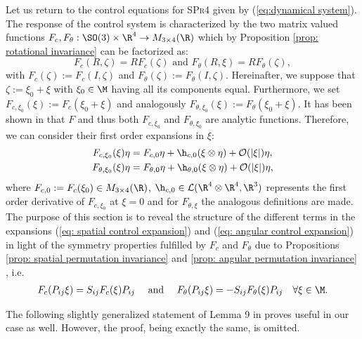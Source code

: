 \label{sec: linearization}
Let us return to the control equations for \textsc{SPr4} given by (\ref{eq:dynamical system}). The response of the control system is characterized by the two matrix valued functions $F_c, F_{\theta}: \SO(3) \times \R^4 \to M_{3 \times 4}(\R)$ which by Proposition \ref{prop: rotational invariance} can be factorized as:
\begin{equation}
\label{eq: reminder control system}
	F_{c}(R, \zeta) = R F_{c}(\zeta) \text{ and } F_{\theta}(R, \xi) = R F_{\theta}(\zeta),
\end{equation}
with $F_{c}(\zeta) := F_c(I, \zeta)$ and $F_{\theta}(\zeta) := F_{\theta}(I, \zeta)$. Hereinafter, we suppose that $\zeta := \xi_0 + \xi$ with $\xi_0 \in \M$ having all its components equal. Furthermore, we set $F_{c, \xi_0}(\xi) := F_{c}(\xi_0 + \xi)$ and analogously $F_{\theta, \xi_0}(\xi) := F_{\theta}(\xi_0 + \xi)$. It has been shown in \cite{Alouges2013} that $F$ and thus both $F_{ c, \xi_0}$ and $F_{\theta, \xi_0}$ are analytic functions. Therefore, we can consider their first order expansions in $\xi$:
\begin{align}
\label{eq: spatial control expansion}
	F_{c, \xi_0}(\xi)\eta &= F_{c, 0} \eta  + \h_{c,0}(\xi \otimes \eta) + \mathcal{O}(|\xi|)\eta,\\
\label{eq: angular control expansion}
	F_{\theta, \xi_0}(\xi) \eta &= F_{\theta, 0} \eta + \h_{\theta, 0}(\xi \otimes \eta) + \mathcal{O}(|\xi|)\eta,
\end{align}
where $F_{c,0} := F_{c}(\xi_0) \in M_{3 \times 4}(\R)$, $\h_{c,0}\in \mathcal{L}(\R^4 \otimes \R^4, \R^3)$ represents the first order derivative of $F_{c, \xi_0}$ at $\xi = 0$ and for $F_{\theta, \xi}$ the analogous definitions are made.
The purpose of this section is to reveal the structure of the different terms in the expansions (\ref{eq: spatial control expansion}) and (\ref{eq: angular control expansion}) in light of the symmetry properties fulfilled by $F_{c}$ and $F_{\theta}$ due to Propositions \ref{prop: spatial permutation invariance} and \ref{prop: angular permutation invariance} , i.e.
\begin{align}
\label{eq: spatial and angular first order expansion}
	F_{c}(P_{ij} \xi) = S_{ij} F_{c}(\xi) P_{ij}& & \text{ and } & & 			F_{\theta}(P_{ij} \xi) = - S_{ij} F_{\theta}(\xi) P_{ij} & & \forall \xi \in \M.
\end{align}

The following slightly generalized statement of Lemma 9 in \cite{Alouges2017} proves useful in our case as well. However, the proof, being exactly the same, is omitted.

